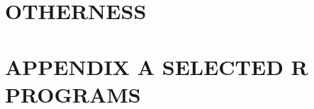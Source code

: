 \documentclass{BGSU}
\numberwithin{equation}{chapter}
\begin{document}
\chapter{\texorpdfstring{OTHERNESS}{}}


\backmatter







\mbox{}\newpage
{}
\appendix
\chapter{\texorpdfstring{APPENDIX A SELECTED R PROGRAMS}{APPENDIX A}}

\end{document}
